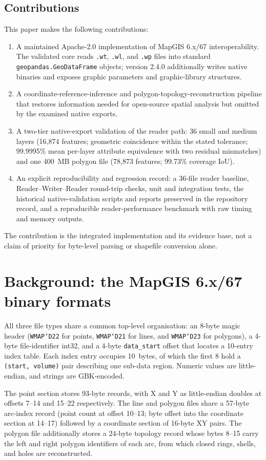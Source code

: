 \documentclass[11pt,a4paper]{article}
\begin{document}
\subsection{Contributions}
This paper makes the following contributions:
\begin{enumerate}
  \item A maintained Apache-2.0 implementation of MapGIS 6.x/67 interoperability. The validated core reads \texttt{.wt}, \texttt{.wl}, and \texttt{.wp} files into standard \texttt{geopandas.GeoDataFrame} objects; version 2.4.0 additionally writes native binaries and exposes graphic parameters and graphic-library structures.
  \item A coordinate-reference-inference and polygon-topology-reconstruction pipeline that restores information needed for open-source spatial analysis but omitted by the examined native exports.
  \item A two-tier native-export validation of the reader path: 36 small and medium layers (16{,}874 features; geometric coincidence within the stated tolerance; 99.9995\% mean per-layer attribute equivalence with two residual mismatches) and one 400~MB polygon file (78{,}873 features; 99.73\% coverage IoU).
  \item An explicit reproducibility and regression record: a 36-file reader baseline, Reader--Writer--Reader round-trip checks, unit and integration tests, the historical native-validation scripts and reports preserved in the repository record, and a reproducible reader-performance benchmark with raw timing and memory outputs.
\end{enumerate}
The contribution is the integrated implementation and its evidence base, not a claim of priority for byte-level parsing or shapefile conversion alone.

\section{Background: the MapGIS 6.x/67 binary formats}
All three file types share a common top-level organisation: an 8-byte magic header (\texttt{WMAP`D22} for points, \texttt{WMAP`D21} for lines, and \texttt{WMAP`D23} for polygons), a 4-byte file-identifier int32, and a 4-byte \texttt{data\_start} offset that locates a 10-entry index table. Each index entry occupies 10~bytes, of which the first 8 hold a \texttt{(start, volume)} pair describing one sub-data region. Numeric values are little-endian, and strings are GBK-encoded.

The point section stores 93-byte records, with X and Y as little-endian doubles at offsets 7--14 and 15--22 respectively. The line and polygon files share a 57-byte arc-index record (point count at offset 10--13; byte offset into the coordinate section at 14--17) followed by a coordinate section of 16-byte XY pairs. The polygon file additionally stores a 24-byte topology record whose bytes 8--15 carry the left and right polygon identifiers of each arc, from which closed rings, shells, and holes are reconstructed.
\end{document}
